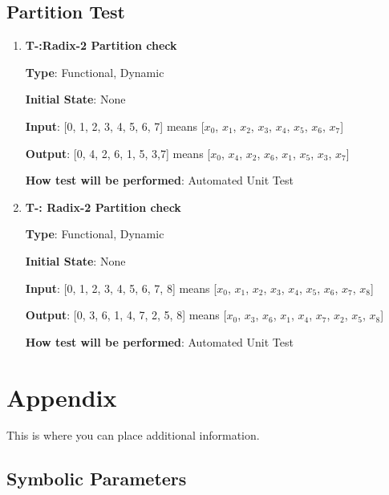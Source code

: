 \documentclass[12pt, titlepage]{article}
\newcounter{tnum}
\begin{document}
\subsection{Partition Test}

\begin{enumerate}

\item{\textbf{T-\thetnum \label{R2P}:Radix-2 Partition check}}

\textbf {Type}: Functional, Dynamic
					
\textbf {Initial State}: None
					
\textbf {Input}: [0, 1, 2, 3, 4, 5, 6, 7] means [$x_0$, $x_1$, $x_2$, $x_3$, $x_4$, $x_5$, $x_6$, $x_7$]
					
\textbf {Output}: [0, 4, 2, 6, 1, 5, 3,7] means [$x_0$, $x_4$, $x_2$, $x_6$, $x_1$, $x_5$, $x_3$, $x_7$]
					
\textbf {How test will be performed}: Automated Unit Test


\item{\textbf{T-\thetnum \label{R3P}: Radix-2 Partition check}}

\textbf {Type}: Functional, Dynamic
					
\textbf {Initial State}: None
					
\textbf {Input}: [0, 1, 2, 3, 4, 5, 6, 7, 8] means [$x_0$, $x_1$, $x_2$, $x_3$, $x_4$, $x_5$, $x_6$, $x_7$, $x_8$]
					
\textbf {Output}: [0, 3, 6, 1, 4, 7, 2, 5, 8] means [$x_0$, $x_3$, $x_6$, $x_1$, $x_4$, $x_7$, $x_2$, $x_5$, $x_8$]
					
\textbf {How test will be performed}:  Automated Unit Test

\end{enumerate}	






\newpage

\section{Appendix}

This is where you can place additional information.

\subsection{Symbolic Parameters}
\end{document}
